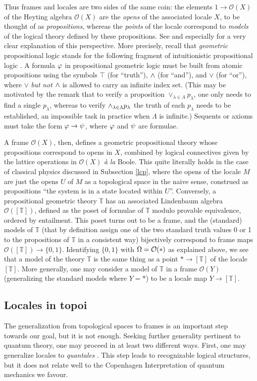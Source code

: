 \documentclass[11pt]{article}
\newcommand{\raw}{\rightarrow} \newcommand{\rat}{\mapsto}
\newcommand{\lm}{\lambda} \newcommand{\Lm}{\Lambda}
\newcommand{\CO}{{\mathcal O}} \newcommand{\CP}{{\mathcal P}}
\newcommand{\T}{{\mathbb T}} \newcommand{\Z}{{\mathbb Z}}
\begin{document}
Thus  frames and locales are two sides of the same coin: the elements
$1\raw\CO(X)$  of the Heyting algebra $\CO(X)$ are the {\it opens} of the
associated locale $X$,
to be thought of as {\it propositions}, whereas the {\it points} of the locale
correspond to {\it models} of the logical theory defined by these propositions.
See \cite{johnstone02b,maclanemoerdijk92} and especially \cite{Vic:LocTopSp} for
a very clear explanation of this perspective.
More precisely, recall that {\it geometric} propositional logic stands for
the following  fragment of  intuitionistic propositional  logic
\cite{maclanemoerdijk92,johnstone02b,Vic:LocTopSp}. A formula $\varphi$ in propositional
geometric logic must be  built from
atomic propositions  using the  symbols $\top$ (for ``truth''), $\wedge$ (for
``and''), and $\vee$
(for ``or''),  where
$\vee$ {\it but not $\wedge$} is allowed to carry an infinite index set. (This may
be motivated by the remark that to verify a proposition $\vee_{\lm\in\Lambda}
p_{\lm}$, one only needs to find a single $p_{\lm}$, whereas
to  verify $\wed_{\lm\in\Lambda} p_{\lm}$ the truth of each $p_{\lm}$ needs to
be established, an impossible task in practice when $\Lm$ is infinite.)
Sequents or axioms must take the form  $\phv\raw\ps$, where $\varphi$ and $\psi$ are formulae.

A frame $\CO(X)$, then, defines a geometric propositional theory
 whose propositions
correspond to opens in $X$, combined by logical connectives given by the lattice
operations
in $\CO(X)$ {\it \`a la} Boole.  This quite literally holds in the case of
classical physics discussed in Subsection \ref{lcp},
where the opens of the locale $M$ are just the opens $U$ of $M$ as a topological
space in the naive sense, construed as
propositions ``the system is in a state located within $U$''.
Conversely, a propositional geometric theory $\T$ has an associated Lindenbaum
algebra $\CO([\T])$, defined as the poset  of
formulae of $\T$ modulo provable equivalence, ordered by entailment. This poset
turns out to be a frame, and the (standard) models of $\T$ (that by definition
assign one of the two  standard truth values 0 or 1 to the propositions of $\T$
in a consistent way) bijectively correspond to frame maps $\CO([\T])\raw
\{0,1\}$. Identifying $\{0,1\}$ with $\Om=\CO(*)$ as explained above,
we see that a model of the theory $\T$ is the same thing as a
 point $*\raw [\T]$ of the locale $[\T]$.  More generally, one may consider a
model of
 $\T$ in a frame $\CO(Y)$ (generalizing the standard models where $Y=*$) to be a
 locale map $Y\raw [\T]$.
 \subsection{Locales in topoi}\label{subsection:locale3}
The generalization from topological spaces to frames is
an important step towards our goal, but it is not enough.
Seeking further generality pertinent to quantum theory,
 one may proceed in at least two different ways. First, one may generalize
  locales to {\it
quantales} \cite{Mulvey:andthen}. This step leads to recognizable
logical structures, but it does not relate well to the Copenhagen
Interpretation of quantum mechanics we favour.
\end{document}
